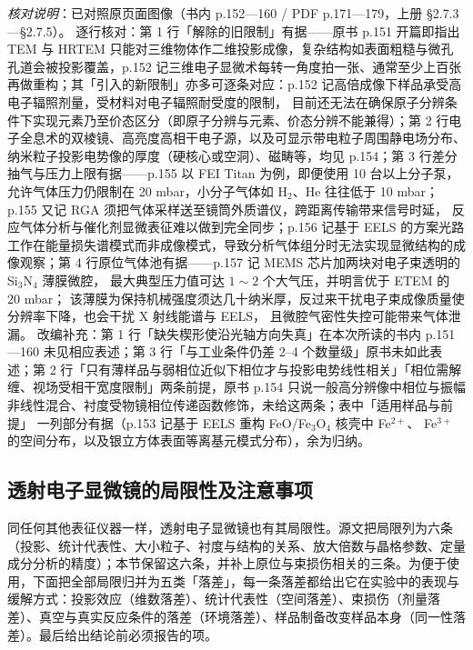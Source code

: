 \emph{核对说明}：已对照原页面图像（书内 p.152—160 / PDF p.171—179，上册
§2.7.3—§2.7.5）。
逐行核对：第 1 行「解除的旧限制」有据——原书 p.151 开篇即指出 TEM 与 HRTEM
只能对三维物体作二维投影成像，复杂结构如表面粗糙与微孔孔道会被投影覆盖，p.152
记三维电子显微术每转一角度拍一张、通常至少上百张再做重构；其「引入的新限制」亦多可逐条对应：p.152
记高倍成像下样品承受高电子辐照剂量，受材料对电子辐照耐受度的限制，
目前还无法在确保原子分辨条件下实现元素乃至价态区分（即原子分辨与元素、价态分辨不能兼得）；第 2
行电子全息术的双棱镜、高亮度高相干电子源，以及可显示带电粒子周围静电场分布、纳米粒子投影电势像的厚度（硬核心或空洞）、磁畴等，均见 p.154；第 3 行差分抽气与压力上限有据——p.155 以 FEI Titan 为例，即便使用
10 台以上分子泵，允许气体压力仍限制在 20 mbar，小分子气体如 H$_2$、He 往往低于 10 mbar；
p.155 又记 RGA 须把气体采样送至镜筒外质谱仪，跨距离传输带来信号时延，
反应气体分析与催化剂显微表征难以做到完全同步；p.156 记基于 EELS
的方案光路工作在能量损失谱模式而非成像模式，导致分析气体组分时无法实现显微结构的成像观察；第 4
行原位气体池有据——p.157 记 MEMS 芯片加两块对电子束透明的 Si$_3$N$_4$ 薄膜微腔，
最大典型压力值可达 $1\sim2$ 个大气压，并明言优于 ETEM 的 20 mbar；
该薄膜为保持机械强度须达几十纳米厚，反过来干扰电子束成像质量使分辨率下降，也会干扰 X 射线能谱与 EELS，
且微腔气密性失控可能带来气体泄漏。
改编补充：第 1 行「缺失楔形使沿光轴方向失真」在本次所读的书内 p.151—160 未见相应表述；第 3
行「与工业条件仍差 2--4 个数量级」原书未如此表述；第 2
行「只有薄样品与弱相位近似下相位才与投影电势线性相关」「相位需解缠、视场受相干宽度限制」两条前提，原书 p.154
只说一般高分辨像中相位与振幅非线性混合、衬度受物镜相位传递函数修饰，未给这两条；表中「适用样品与前提」
一列部分有据（p.153 记基于 EELS 重构 FeO/Fe$_3$O$_4$ 核壳中 Fe$^{2+}$、
Fe$^{3+}$ 的空间分布，以及银立方体表面等离基元模式分布），余为归纳。


\subsection{透射电子显微镜的局限性及注意事项}

同任何其他表征仪器一样，透射电子显微镜也有其局限性。源文把局限列为六条（投影、统计代表性、大小粒子、衬度与结构的关系、放大倍数与晶格参数、定量成分分析的精度）；本节保留这六条，并补上原位与束损伤相关的三条。为便于使用，下面把全部局限归并为五类「落差」，每一条落差都给出它在实验中的表现与缓解方式：投影效应（维数落差）、统计代表性（空间落差）、束损伤（剂量落差）、真空与真实反应条件的落差（环境落差）、样品制备改变样品本身（同一性落差）。最后给出结论前必须报告的项。

